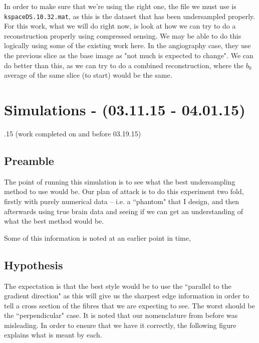 \documentclass[11 pt]{article}
\let\oldsection\section
\renewcommand\section{\clearpage\newpage\oldsection}
\begin{document}
  In order to make sure that we're using the right one, the file we must use is \verb!kspaceDS.10.32.mat!, as this is the dataset that has been undersampled properly. For this work, what we will do right now, is look at how we can try to do a reconstruction properly using compressed sensing. We may be able to do this logically using some of the existing work here. In the angiography case, they use the previous slice as the base image as "not much is expected to change". We can do better than this, as we can try to do a combined reconstruction, where the $b_0$ average of the same slice (to start) would be the same. 

\section{Simulations - (03.11.15 - 04.01.15)}
.15 (work completed on and before 03.19.15)
  \subsection{Preamble}

  The point of running this simulation is to see what the best undersampling method to use would be. Our plan of attack is to do this experiment two fold, firstly with purely numerical data -- i.e. a ``phantom" that I design, and then afterwards using true brain data and seeing if we can get an understanding of what the best method would be. 
  
  Some of this information is noted at an earlier point in time, 

  \subsection{Hypothesis}

  The expectation is that the best style would be to use the ``parallel to the gradient direction" as this will give us the sharpest edge information in order to tell a cross section of the fibres that we are expecting to see. The worst should be the ``perpendicular" case. It is noted that our nomenclature from before was misleading. In order to ensure that we have it correctly, the following figure explains what is meant by each.
\end{document}
